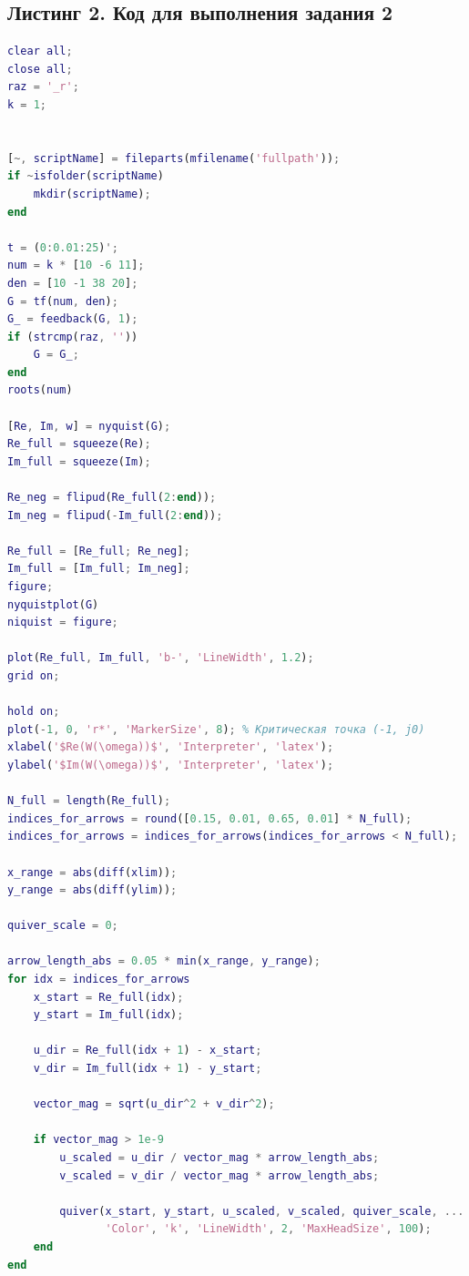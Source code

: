 \documentclass[a4paper]{article}
\begin{document}
\subsection*{Листинг 2. Код для выполнения задания 2}

\begin{lstlisting}[caption={Код для построения графиков для задания 2}, language=matlab]
clear all;
close all;
raz = '_r';
k = 1;


[~, scriptName] = fileparts(mfilename('fullpath'));
if ~isfolder(scriptName)
    mkdir(scriptName);
end

t = (0:0.01:25)';
num = k * [10 -6 11];
den = [10 -1 38 20];
G = tf(num, den);
G_ = feedback(G, 1);
if (strcmp(raz, ''))
    G = G_;
end
roots(num)

[Re, Im, w] = nyquist(G);
Re_full = squeeze(Re);
Im_full = squeeze(Im);

Re_neg = flipud(Re_full(2:end));
Im_neg = flipud(-Im_full(2:end));

Re_full = [Re_full; Re_neg];
Im_full = [Im_full; Im_neg];
figure;
nyquistplot(G)
niquist = figure;

plot(Re_full, Im_full, 'b-', 'LineWidth', 1.2);
grid on;

hold on;
plot(-1, 0, 'r*', 'MarkerSize', 8); % Критическая точка (-1, j0)
xlabel('$Re(W(\omega))$', 'Interpreter', 'latex');
ylabel('$Im(W(\omega))$', 'Interpreter', 'latex');

N_full = length(Re_full);
indices_for_arrows = round([0.15, 0.01, 0.65, 0.01] * N_full);
indices_for_arrows = indices_for_arrows(indices_for_arrows < N_full); 

x_range = abs(diff(xlim));
y_range = abs(diff(ylim));

quiver_scale = 0;

arrow_length_abs = 0.05 * min(x_range, y_range);
for idx = indices_for_arrows
    x_start = Re_full(idx);
    y_start = Im_full(idx);
    
    u_dir = Re_full(idx + 1) - x_start;
    v_dir = Im_full(idx + 1) - y_start;
    
    vector_mag = sqrt(u_dir^2 + v_dir^2);
    
    if vector_mag > 1e-9
        u_scaled = u_dir / vector_mag * arrow_length_abs;
        v_scaled = v_dir / vector_mag * arrow_length_abs;
        
        quiver(x_start, y_start, u_scaled, v_scaled, quiver_scale, ...
               'Color', 'k', 'LineWidth', 2, 'MaxHeadSize', 100); 
    end
end


\end{lstlisting}
\end{document}
